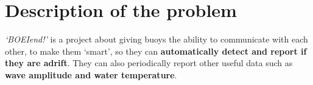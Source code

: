 \documentclass[11pt,a4paper,twoside]{article} %
\begin{document}
%



\section{Description of the problem}

\textit{`BOEIend!'} is a project about giving buoys the ability to communicate with each other, to make them `smart', so they can \textbf{automatically detect and report if they are adrift}. They can also periodically report other useful data such as \textbf{wave amplitude and water temperature}.
\end{document}
